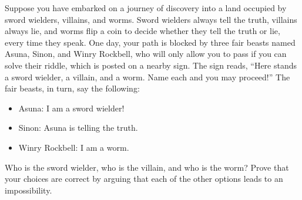 \item Suppose you have embarked on a journey of discovery into a land occupied by sword wielders, villains, and worms. Sword wielders always tell the truth, villains always lie, and worms flip a coin to decide whether they tell the truth or lie, every time they speak. One day, your path is blocked by three fair beasts named Asuna, Sinon, and Winry Rockbell, who will only allow you to pass if you can solve their riddle, which is posted on a nearby sign. The sign reads, ``Here stands a sword wielder, a villain, and a worm. Name each and you may proceed!'' The fair beasts, in turn, say the following:
\begin{itemize}
 \item Asuna: {\Fontlukas I am a sword wielder!}
 \item Sinon: {\Fontlukas Asuna is telling the truth.}
 \item Winry Rockbell: {\Fontlukas I am a worm.}
 \end{itemize}
 Who is the sword wielder, who is the villain, and who is the worm? Prove that your choices are correct by arguing that each of the other options leads to an impossibility.